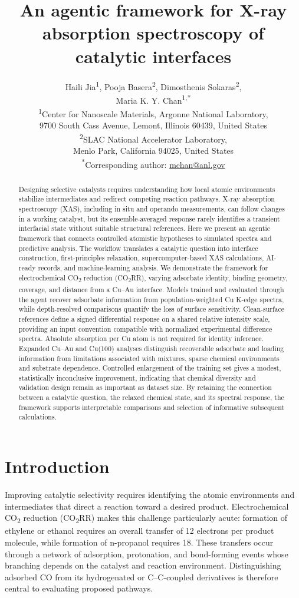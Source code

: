 \documentclass[11pt,a4paper]{article}
\title{An agentic framework for X-ray absorption spectroscopy of catalytic interfaces}
\author{\small Haili Jia\textsuperscript{1}, Pooja Basera\textsuperscript{2}, Dimosthenis Sokaras\textsuperscript{2},\\
\small Maria K. Y. Chan\textsuperscript{1,*}\\[0.6em]
\small \textsuperscript{1}Center for Nanoscale Materials, Argonne National Laboratory,\\
\small 9700 South Cass Avenue, Lemont, Illinois 60439, United States\\
\small \textsuperscript{2}SLAC National Accelerator Laboratory,\\
\small Menlo Park, California 94025, United States\\
\small \textsuperscript{*}Corresponding author: \href{mailto:mchan@anl.gov}{mchan@anl.gov}}
\date{}
\begin{document}
\maketitle
\begin{abstract}
Designing selective catalysts requires understanding how local atomic environments stabilize intermediates and redirect competing reaction pathways. X-ray absorption spectroscopy (XAS), including in situ and operando measurements, can follow changes in a working catalyst, but its ensemble-averaged response rarely identifies a transient interfacial state without suitable structural references. Here we present an agentic framework that connects controlled atomistic hypotheses to simulated spectra and predictive analysis. The workflow translates a catalytic question into interface construction, first-principles relaxation, supercomputer-based XAS calculations, AI-ready records, and machine-learning analysis. We demonstrate the framework for electrochemical CO\textsubscript{2} reduction (CO\textsubscript{2}RR), varying adsorbate identity, binding geometry, coverage, and distance from a Cu--Au interface. Models trained and evaluated through the agent recover adsorbate information from population-weighted Cu K-edge spectra, while depth-resolved comparisons quantify the loss of surface sensitivity. Clean-surface references define a signed differential response on a shared relative intensity scale, providing an input convention compatible with normalized experimental difference spectra. Absolute absorption per Cu atom is not required for identity inference. Expanded Cu--Au and Cu(100) analyses distinguish recoverable adsorbate and loading information from limitations associated with mixtures, sparse chemical environments and substrate dependence. Controlled enlargement of the training set gives a modest, statistically inconclusive improvement, indicating that chemical diversity and validation design remain as important as dataset size. By retaining the connection between a catalytic question, the relaxed chemical state, and its spectral response, the framework supports interpretable comparisons and selection of informative subsequent calculations.
\end{abstract}

\section{Introduction}
Improving catalytic selectivity requires identifying the atomic environments and intermediates that direct a reaction toward a desired product. Electrochemical CO\textsubscript{2} reduction (CO\textsubscript{2}RR) makes this challenge particularly acute: formation of ethylene or ethanol requires an overall transfer of 12 electrons per product molecule, while formation of n-propanol requires 18.\cite{ni2024,francis2018} These transfers occur through a network of adsorption, protonation, and bond-forming events whose branching depends on the catalyst and reaction environment. Distinguishing adsorbed CO from its hydrogenated or C--C-coupled derivatives is therefore central to evaluating proposed pathways.\cite{zhan2024,montoya2015}
\end{document}
